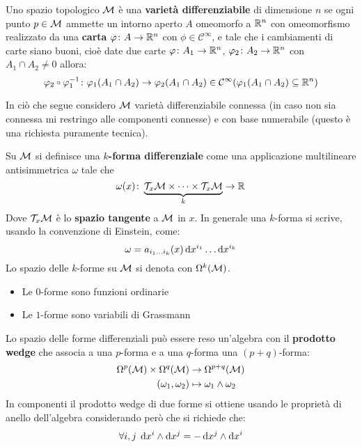 \begin{definition}
  Uno spazio topologico $ \mathcal{M} $ è una \textbf{varietà differenziabile}
  di dimensione $ n $ se ogni punto $ p \in \mathcal{M} $ ammette un intorno aperto $ A $ omeomorfo a $ \mathbb{R}^{n} $
  con omeomorfismo realizzato da una \textbf{carta}
  $ \varphi \colon A \to \mathbb{R}^{n} $ con $ \phi \in \mathcal{C}^\infty $, e tale che i cambiamenti di carte siano buoni, cioè
  date due carte $ \varphi \colon A_1 \to \mathbb{R}^{n} $, $ \varphi_2 \colon A_2 \to \mathbb{R}^{n} $ con $ A_1 \cap A_2 \not = 0 $ allora:
  \[
    \phi_2 \circ \phi_1^{-1} \colon \phi_1(A_1 \cap A_2) \to \phi_2(A_1 \cap A_2) \in \mathcal{C}^\infty(\phi_1(A_1 \cap A_2) \subseteq \RN{n})
  \]
\end{definition}
In ciò che segue considero $ \mathcal{M} $ varietà differenziabile connessa (in caso non sia connessa mi restringo
alle componenti connesse) e con base numerabile (questo è una richiesta puramente tecnica).
\begin{definition}
  Su $ \mathcal{M} $ si definisce una \textbf{$ k $-forma differenziale} come
  una applicazione multilineare antisimmetrica $ \omega $ tale che
  \[
    \omega(x) \colon \underbrace{\mathcal{T}_x\mathcal{M} \times \dots \times \mathcal{T}_x\mathcal{M}}_{k} \to \mathbb{R}^{}
  \]
  Dove $ \mathcal{T}_x\mathcal{M} $ è lo \textbf{spazio tangente} a $ \mathcal{M} $ in $ x $.
  In generale una $ k $-forma si scrive, usando la convenzione di Einstein, come:
  \[
    \omega = a_{i_1\dots i_k}(x) \operatorname{d}\!{x}^{i_1} \dots \operatorname{d}\!{x}^{i_k}
  \]
  Lo spazio delle $ k $-forme su $ \mathcal{M} $ si denota con $ \Omega^k(\mathcal{M}) $.
\end{definition}
\begin{example}\hfill
  \begin{itemize}
  \item Le $ 0 $-forme sono funzioni ordinarie
  \item Le $ 1 $-forme sono variabili di Grassmann
  \end{itemize}
\end{example}
\begin{definition}
  Lo spazio delle forme differenziali può essere reso un'algebra con il \textbf{prodotto wedge}
  che associa a una $ p $-forma e a una $ q $-forma una $ (p+q) $-forma:
  \begin{align*}
    \Omega^p(\mathcal{M}) \times \Omega^q(\mathcal{M}) & \to \Omega^{p+q}(\mathcal{M}) \\
    (\omega_1, \omega_2) & \mapsto \omega_1 \wedge \omega_2
  \end{align*}
  In componenti il prodotto wedge di due forme si ottiene usando le proprietà di anello dell'algebra
  considerando però che si richiede che:
  \[
    \forall i,j \; \operatorname{d}\!{x}^i \wedge \operatorname{d}\!{x}^j = - \operatorname{d}\!{x}^j \wedge \operatorname{d}\!{x}^i
  \]
\end{definition}
